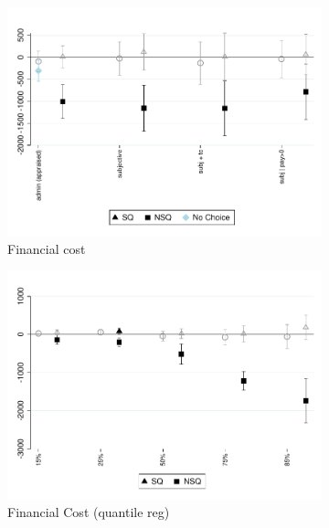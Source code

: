 \documentclass[oneside,11pt]{article}
\begin{document}
\begin{figure}[H]
    \caption{The effect of choice between fee-commitment and status quo}
    \label{fc_pro4}
    \begin{center}
    \begin{subfigure}{0.45\textwidth}
        \caption{Financial cost}
        \centering
        \includegraphics[width=\textwidth]{Figuras/fc_te_pro_4.pdf}
    \end{subfigure}
        \begin{subfigure}{0.45\textwidth}
        \caption{Financial Cost (quantile reg)}
        \centering
        \includegraphics[width=\textwidth]{Figuras/fc_quantile_pro_4.pdf}
    \end{subfigure}
    \begin{subfigure}{0.5\textwidth}
    

\end{subfigure}
\end{center}
\end{figure}
\end{document}
